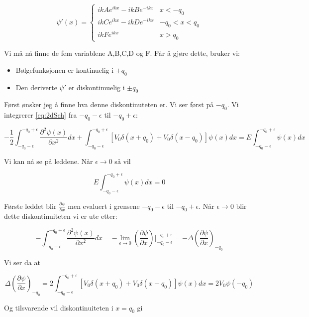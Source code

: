 \documentclass[a4paper,norsk, 10pt]{article}
\numberwithin{equation}{section}
\begin{document}
\begin{equation}
\psi'(x) = 
\begin{cases}
ikAe^{ikx} - ikBe^{-ikx} & x< -q_0 \\
ikCe^{ikx} -ikDe^{-ikx} & -q_0 < x< q_0 \\
ikFe^{ikx} & x>q_0 
\end{cases}
\label{eq:psiDer}
\end{equation}

Vi må nå finne de fem variablene A,B,C,D og F. Får å gjøre dette, bruker vi:

\begin{itemize}
\item Bølgefunksjonen er kontinuelig i $\pm q_0$
\item Den deriverte $\psi'$ er diskontimuelig i $\pm q_0$
\end{itemize}

Først ønsker jeg å finne hva denne diskontinuteten er. Vi ser først på $-q_0$. Vi integrerer \eqref{eq:2dSch} fra $-q_0 - \epsilon$ til $-q_0 + \epsilon$:

$$
-\frac{1}{2}\int_{-q_0 - \epsilon}^{-q_0 + \epsilon}\frac{\partial^2 \psi(x)}{\partial x^2}dx + \int_{-q_0 - \epsilon}^{-q_0 + \epsilon}\left[V_0\delta(x+q_0) + V_0\delta(x-q_0)\right]\psi(x)dx = E\int_{-q_0 - \epsilon}^{-q_0 + \epsilon}\psi(x) dx
$$

Vi kan nå se på leddene. Når $\epsilon \rightarrow 0$ så vil 

$$E\int_{-q_0 - \epsilon}^{-q_0 + \epsilon}\psi(x) dx = 0$$

Første leddet blir $\frac{\partial \psi}{\partial x}$ men evaluert i grensene $-q_0-\epsilon$ til $-q_0 +\epsilon$. Når $\epsilon \rightarrow 0$ blir dette diskontinuiteten vi er ute etter: 

$$
-\int_{-q_0 - \epsilon}^{-q_0 + \epsilon}\frac{\partial^2 \psi(x)}{\partial x^2}dx = -\lim_{\epsilon \rightarrow 0}\left(\frac{\partial \psi}{\partial x}\right)\bigg|_{-q_0 - \epsilon}^{-q_0 + \epsilon} = -\Delta \left(\frac{\partial \psi}{\partial x}\right)_{-q_0}
$$

Vi ser da at

\begin{equation}
\Delta \left(\frac{\partial \psi}{\partial x}\right)_{-q_0} = 2\int_{-q_0 - \epsilon}^{-q_0 + \epsilon}\left[V_0\delta(x+q_0) + V_0\delta(x-q_0)\right]\psi(x)dx = 2V_0\psi(-q_0)
\label{eq:deltapsi-q0}
\end{equation}

Og tilsvarende vil diskontinuiteten i $x = q_0$ gi
\end{document}
